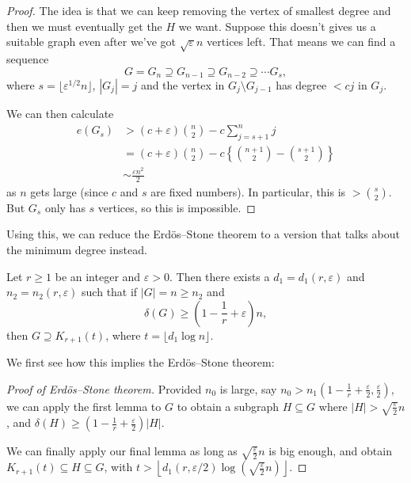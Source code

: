 \documentclass[a4paper]{article}
\begin{document}
\begin{proof}
  The idea is that we can keep removing the vertex of smallest degree and then we must eventually get the $H$ we want. Suppose this doesn't gives us a suitable graph even after we've got $\sqrt{\varepsilon}n$ vertices left. That means we can find a sequence
  \[
    G = G_n \supseteq G_{n - 1} \supseteq G_{n - 2} \supseteq \cdots G_s,
  \]
  where $s = \lfloor \varepsilon^{1/2}n \rfloor$, $|G_j| = j$ and the vertex in $G_j \setminus G_{j - 1}$ has degree $< cj$ in $G_j$.

  We can then calculate
  \begin{align*}
    e(G_s) &> (c + \varepsilon) \binom{n}{2} - c \sum_{j = s + 1}^n j \\
    &= (c + \varepsilon) \binom{n}{2} - c \left\{\binom{n+1}{2} - \binom{s + 1}{2}\right\} \\
    &\sim \frac{\varepsilon n^2}{2}
  \end{align*}
  as $n$ gets large (since $c$ and $s$ are fixed numbers). In particular, this is $> \binom{s}{2}$. But $G_s$ only has $s$ vertices, so this is impossible.
\end{proof}

Using this, we can reduce the Erd\"os--Stone theorem to a version that talks about the minimum degree instead.
\begin{lemma}
  Let $r \geq 1$ be an integer and $\varepsilon > 0$. Then there exists a $d_1 = d_1(r, \varepsilon)$ and $n_2 = n_2(r, \varepsilon)$ such that if $|G| = n \geq n_2$ and
  \[
    \delta(G) \geq \left(1 - \frac{1}{r} + \varepsilon\right)n,
  \]
  then $G \supseteq K_{r + 1}(t)$, where $t = \lfloor d_1 \log n\rfloor$.
\end{lemma}
We first see how this implies the Erd\"os--Stone theorem:

\begin{proof}[Proof of Erd\"os--Stone theorem]
  Provided $n_0$ is large, say $n_0 > n_1\left(1 - \frac{1}{r} + \frac{\varepsilon}{2}, \frac{\varepsilon}{2}\right)$, we can apply the first lemma to $G$ to obtain a subgraph $H \subseteq G$ where $|H| > \sqrt{\frac{\varepsilon}{2}} n$, and $\delta(H) \geq \left(1 - \frac{1}{r} + \frac{\varepsilon}{2}\right) |H|$.

  We can finally apply our final lemma as long as $\sqrt{\frac{\varepsilon}{2}} n$ is big enough, and obtain $K_{r + 1}(t) \subseteq H \subseteq G$, with $t > \left\lfloor d_1(r, \varepsilon/2) \log \left(\sqrt{\frac{\varepsilon}{2}} n\right)\right\rfloor$.
\end{proof}
\end{document}
